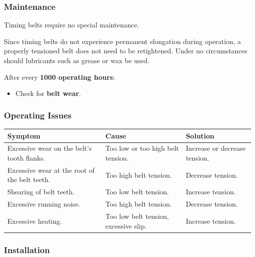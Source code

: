 \newpage

\setcounter{page}{5}

\subsubsection*{Maintenance}

Timing belts require no special maintenance.

Since timing belts do not experience permanent elongation during operation, a properly tensioned belt does not need to be retightened.  
Under no circumstances should lubricants such as grease or wax be used.

After every \textbf{1000 operating hours}:
\begin{itemize}
    \item Check for \textbf{belt wear}.
\end{itemize}

\subsubsection*{Operating Issues}

\begin{table}[H]
    \centering
    \renewcommand{\arraystretch}{1.2}
    \begin{tabular}{|p{}|p{}|p{}|}
        \hline
        \textbf{Symptom} & \textbf{Cause} & \textbf{Solution} \\
        \hline
        Excessive wear on the belt's tooth flanks. & Too low or too high belt tension. & Increase or decrease tension. \\
        \hline
        Excessive wear at the root of the belt teeth. & Too high belt tension. & Decrease tension. \\
        \hline
        Shearing of belt teeth. & Too low belt tension. & Increase tension. \\
        \hline
        Excessive running noise. & Too high belt tension. & Decrease tension. \\
        \hline
        Excessive heating. & Too low belt tension, excessive slip. & Increase tension. \\
        \hline
    \end{tabular}
\end{table}


\subsubsection*{Installation}


